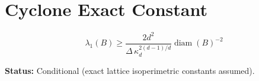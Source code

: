 \documentclass{article}
\begin{document}
\section*{Cyclone Exact Constant}

\[
\lambda_1(B)\ge
\frac{2d^2}{\Delta\,\kappa_d^{2(d-1)/d}}
\operatorname{diam}(B)^{-2}
\]

\textbf{Status:} Conditional (exact lattice isoperimetric constants assumed).
\end{document}
